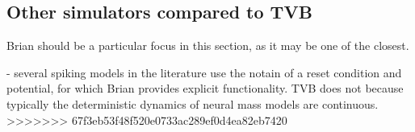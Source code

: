 \subsection{Other simulators compared to TVB}

    Brian should be a particular focus in this section, as it may
    be one of the closest. 

    - several spiking models in the literature use the notain of a reset
        condition and potential, for which Brian provides explicit
        functionality. TVB does not because typically the deterministic
        dynamics of neural mass models are continuous.
>>>>>>> 67f3eb53f48f520e0733ac289ef0d4ea82eb7420
